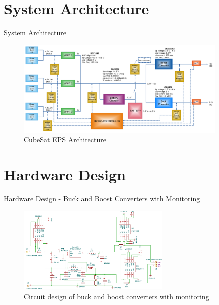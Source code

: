 \documentclass[aspectratio=169]{beamer}
\begin{document}
		
		
		\section{System Architecture}
		\begin{frame}{System Architecture}
			\begin{figure}[h]
				\centering
				\includegraphics[width=0.9\textwidth]{diag1 with specs.pdf}
				\caption{CubeSat EPS Architecture}
				\label{fig:mesh1}
			\end{figure}
			
			
		\end{frame}
		
		\section{Hardware Design}
		\begin{frame}{Hardware Design - Buck and Boost Converters with Monitoring }
			\begin{figure}[h]
				\centering
				\includegraphics[width=0.65\textwidth]{diag/1.pdf}
				\caption{Circuit design of buck and boost converters with monitoring}
				\label{fig:bubo}
			\end{figure}
		\end{frame}
		
\end{document}
